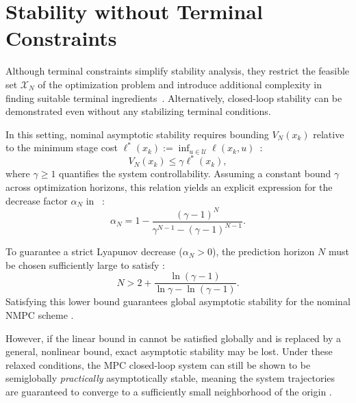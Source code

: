 \section{Stability without Terminal Constraints}
\label{sec:stability-without-terminal}

Although terminal constraints simplify stability analysis, they restrict the feasible set $\mathcal{X}_N$ of 
the optimization problem and introduce additional complexity in finding suitable terminal ingredients~. 
Alternatively, closed-loop stability can be demonstrated even without any stabilizing terminal conditions. 

In this setting, nominal asymptotic stability requires bounding $V_N(x_k)$ relative to the minimum stage cost
$\ell^*(x_k) := \inf_{u \in \mathcal{U}} \ell(x_k, u)$~:
\begin{equation}
    \label{eq:general-stability-condition}
    V_N(x_k) \leq \gamma \ell^*(x_k),
\end{equation}
where $\gamma \geq 1$ quantifies the system controllability. 
Assuming a constant bound $\gamma$ across optimization horizons, 
this relation yields an explicit expression for the decrease factor $\alpha_N$ in 
~:
\begin{equation}
    \label{eq:without-terminal-alpha}
    \alpha_N = 1 - \frac{(\gamma - 1)^N}{\gamma^{N-1} - (\gamma - 1)^{N-1}}.
\end{equation}

To guarantee a strict Lyapunov decrease ($\alpha_N > 0$), the prediction horizon $N$ must be chosen sufficiently large to satisfy 
\cite[Remark 6.22]{gruneNonlinearModelPredictive2017}:
\begin{equation}
    \label{eq:without-terminal-N}
    N > 2 + \frac{\ln(\gamma - 1)}{\ln \gamma - \ln(\gamma - 1)}.
\end{equation}
Satisfying this lower bound guarantees global asymptotic stability for the nominal NMPC scheme
.

However, if the linear bound in  cannot be satisfied globally and 
is replaced by a general, nonlinear bound, exact asymptotic stability may be lost. Under these relaxed conditions, 
the MPC closed-loop system can still be shown to be semiglobally \textit{practically} asymptotically stable, 
meaning the system trajectories are guaranteed to converge to a sufficiently small neighborhood of the origin 
.